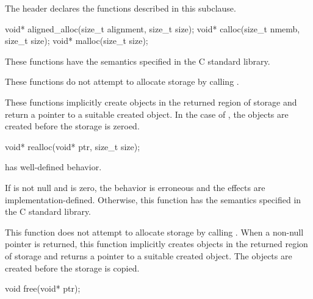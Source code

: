 \pnum
\begin{note}
The header 
declares the functions described in this subclause.
\end{note}

%
%
%
\begin{itemdecl}
void* aligned_alloc(size_t alignment, size_t size);
void* calloc(size_t nmemb, size_t size);
void* malloc(size_t size);
\end{itemdecl}

\begin{itemdescr}
\pnum
\effects
These functions have the semantics specified in the C standard library.

\pnum
\remarks
These functions do not attempt to allocate
storage by calling .
%

\pnum
These functions implicitly create objects
in the returned region of storage and
return a pointer to a suitable created object.
In the case of ,
the objects are created before the storage is zeroed.
\end{itemdescr}

%
\begin{itemdecl}
void* realloc(void* ptr, size_t size);
\end{itemdecl}

\begin{itemdescr}
\pnum
\expects
{} has well-defined behavior.

\pnum
\effects
If  is not null and  is zero,
the behavior is erroneous and the effects are implementation-defined.
Otherwise, this function has the semantics specified in the C standard library.

\pnum
\remarks
This function does not attempt to allocate storage
by calling .
When a non-null pointer is returned,
this function implicitly creates objects
in the returned region of storage and
returns a pointer to a suitable created object.
The objects are created before the storage is copied.
\end{itemdescr}

%
\begin{itemdecl}
void free(void* ptr);
\end{itemdecl}

